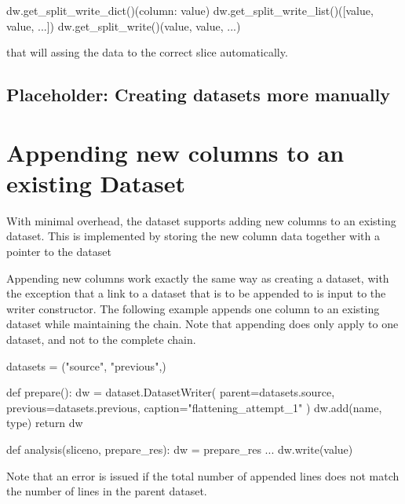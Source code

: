 \begin{python}
  dw.get_split_write_dict()({column: value})
  dw.get_split_write_list()([value, value, ...])
  dw.get_split_write()(value, value, ...)
\end{python}
that will assing the data to the correct slice automatically.

\subsection{Placeholder:  Creating datasets more manually}


\newpage
\section{Appending new columns to an existing Dataset}

With minimal overhead, the dataset supports adding new columns to an
existing dataset.  This is implemented by storing the new column data
together with a pointer to the dataset

Appending new columns work exactly the same way as creating a dataset,
with the exception that a link to a dataset that is to be appended to
is input to the writer constructor.  The following example appends one
column to an existing dataset while maintaining the chain.  Note that
appending does only apply to one dataset, and not to the complete
chain.

\begin{python}
datasets = ("source", "previous",)

def prepare():
  dw = dataset.DatasetWriter(
    parent=datasets.source,
    previous=datasets.previous,
    caption="flattening_attempt_1"
  )
  dw.add(name, type)
  return dw

def analysis(sliceno, prepare_res):
  dw = prepare_res
  ...
  dw.write(value)
\end{python}

Note that an error is issued if the total number of appended lines
does not match the number of lines in the parent dataset.
